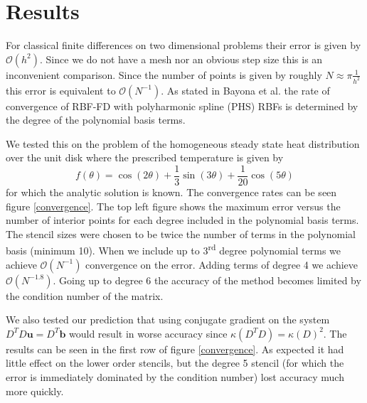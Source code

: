 \documentclass[12pt]{article}
\let\vec\mathbf
\begin{document}
\section{Results} \label{sec_results}

	For classical finite differences on two dimensional problems their error is given by $\mathcal{O}(h^2)$. Since we do not have a mesh nor an obvious step size this is an inconvenient comparison. Since the number of points is given by roughly $N \approx \pi \frac{1}{h^2}$ this error is equivalent to $\mathcal{O}(N^{-1})$. As stated in Bayona et al. \cite{Flyer2017-2} the rate of convergence of RBF-FD with polyharmonic spline (PHS) RBFs is determined by the degree of the polynomial basis terms. 
	
	We tested this on the problem of the homogeneous steady state heat distribution over the unit disk where the prescribed temperature is given by 
	$$f(\theta) = \cos(2\theta) + \frac{1}{3}\sin(3\theta) + \frac{1}{20}\cos(5\theta)$$
	\noindent for which the analytic solution is known. The convergence rates can be seen figure \ref{convergence}. The top left figure shows the maximum error versus the number of interior points for each degree included in the polynomial basis terms. The stencil sizes were chosen to be twice the number of terms in the polynomial basis (minimum 10). When we include up to 3\textsuperscript{rd} degree polynomial terms we achieve $\mathcal{O}(N^{-1})$ convergence on the error. Adding terms of degree 4 we achieve $\mathcal{O}(N^{-1.8})$. Going up to degree 6 the accuracy of the method becomes limited by the condition number of the matrix. 
	
	We also tested our prediction that using conjugate gradient on the system $D^TD \vec{u}=D^T \vec{b}$ would result in worse accuracy since $\kappa(D^TD) = \kappa(D)^2$. The results can be seen in the first row of figure \ref{convergence}. As expected it had little effect on the lower order stencils, but the degree 5 stencil (for which the error is immediately dominated by the condition number) lost accuracy much more quickly. 
	
	
\end{document}
